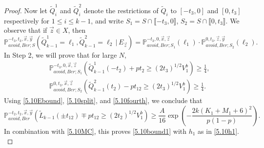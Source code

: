 \begin{proof}
	Now let $\tilde{Q}_i^1$ and $\tilde{Q}_i^2$ denote the restrictions of $\tilde{Q}_i$ to $[-t_3,0]$ and $[0,t_3]$ respectively for $1\leq i\leq k-1$, and write $S_1 = S\cap\llbracket -t_3,0\rrbracket$, $S_2 = S\cap\llbracket 0, t_3\rrbracket$. We observe that if $\vec{z}\in X$, then
	\begin{equation}\label{5.10split}
	\mathbb{P}^{-t_3,t_3,\vec{x},\vec{y}}_{avoid,Ber;S}\left(\tilde{Q}^1_{k-1} = \ell_1, \tilde{Q}^2_{k-1} = \ell_2 \, |\, E_{\vec{z}}\right) = \mathbb{P}^{-t_3,0,\vec{x},\vec{z}}_{avoid,Ber;S_1}(\ell_1)\cdot\mathbb{P}^{0,t_3,\vec{z},\vec{y}}_{avoid,Ber;S_2}(\ell_2).
	\end{equation}
	In Step 2, we will prove that for large $N$,
	\begin{equation}\label{5.10fourth}
	\begin{split}
	&\mathbb{P}^{-t_3,0,\vec{x},\vec{z}}_{avoid,Ber;S_1}\left(\tilde{Q}^1_{k-1}(-t_2) + pt_2 \geq (2t_3)^{1/2}V_1^b\right) \geq \frac{1}{4},\\
	&\mathbb{P}^{0,t_3,\vec{x},\vec{z}}_{avoid,Ber;S_2}\left(\tilde{Q}^2_{k-1}(t_2) - pt_{12} \geq (2t_3)^{1/2}V_1^b\right) \geq \frac{1}{4}.
	\end{split}
	\end{equation}
	Using \eqref{5.10Ebound}, \eqref{5.10split}, and \eqref{5.10fourth}, we conclude that
	\[
	\mathbb{P}^{-t_2,t_2,\vec{x},\vec{y}}_{avoid, Ber}\left(\tilde{L}_{k-1}(\pm t_{12}) \mp pt_{12} \geq (2t_2)^{1/2}V_1^b\right) \geq \frac{A}{16}\exp\left(-\frac{2k(K_1+M_1+6)^2}{p(1-p)}\right).
	\]
	In combination with \eqref{5.10MC}, this proves \eqref{5.10bound1} with $h_1$ as in \eqref{5.10h1}.\\
	

\end{proof}
